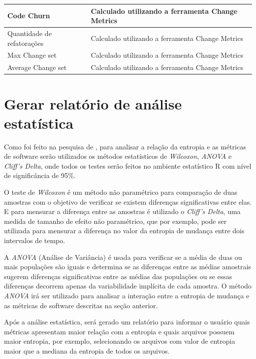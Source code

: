 \begin{table}[H]
\begin{tabular}{|p{4cm}|p{12cm}|}
Code Churn                          & Calculado utilizando a ferramenta Change Metrics                                            \\ \hline
Quantidade de refatorações          & Calculado utilizando a ferramenta Change Metrics                                            \\ \hline
Max Change set                      & Calculado utilizando a ferramenta Change Metrics                                            \\ \hline
Average Change set                  & Calculado utilizando a ferramenta Change Metrics                                            \\ \hline
\end{tabular}
\end{table}

\section{Gerar relatório de análise estatística}
Como foi feito na pesquisa de , para analisar a relação da entropia e as métricas de software serão utilizados os métodos estatísticos de \textit{Wilcoxon}, \textit{ANOVA} e \textit{Cliff's Delta}, onde todos os testes serão feitos no ambiente estatístico R com nível de significância de 95\%.

O teste de \textit{Wilcoxon} é um método não paramétrico para comparação de duas amostras com o objetivo de verificar se existem diferenças significativas entre elas. E para mensurar a diferença entre as amostras é utilizado o \textit{Cliff's Delta}, uma medida de tamanho de efeito não paramétrico, que por exemplo, pode ser utilizada para mensurar a diferença no valor da entropia de mudança entre dois intervalos de tempo.

A \textit{ANOVA} (Análise de Variância) é usada para verificar se a média de duas ou mais populações são iguais e determina se as diferenças entre as médias amostrais sugerem diferenças significativas entre as médias das populações ou se essas diferenças decorrem apenas da variabilidade implícita de cada amostra. O método \textit{ANOVA} irá ser utilizado para analisar a interação entre a entropia de mudança e as métricas de software descritas na seção anterior. 

Após a análise estatística, será gerado um relatório para informar o usuário quais métricas apresentam maior relação com a entropia e quais arquivos possuem maior entropia, por exemplo, selecionando os arquivos com valor de entropia maior que a mediana da entropia de todos os arquivos.

